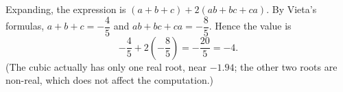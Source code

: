 Expanding, the expression is $(a+b+c)+2(ab+bc+ca)$. By Vieta's formulas, $a+b+c=-\dfrac{4}{5}$ and $ab+bc+ca=-\dfrac{8}{5}$. Hence the value is
\[
-\dfrac{4}{5}+2\left(-\dfrac{8}{5}\right)=-\dfrac{20}{5}=\boxed{-4}.
\]
(The cubic actually has only one real root, near $-1.94$; the other two roots are non-real, which does not affect the computation.)
